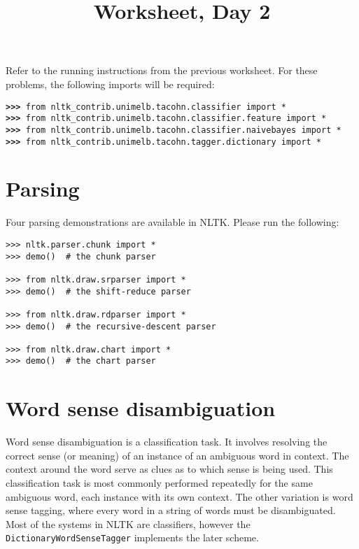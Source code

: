 \documentclass{worksheet}
\title{Worksheet, Day 2}
\begin{document}
\maketitle

Refer to the running instructions from the previous worksheet. For these
problems, the following imports will be required:

\noindent\begin{tabbing}
\tt\textbf{>>>} from nltk\_contrib.unimelb.tacohn.classifier import * \\
\tt\textbf{>>>} from nltk\_contrib.unimelb.tacohn.classifier.feature import * \\
\tt\textbf{>>>} from nltk\_contrib.unimelb.tacohn.classifier.naivebayes import * \\
\tt\textbf{>>>} from nltk\_contrib.unimelb.tacohn.tagger.dictionary import * \\
\end{tabbing}

\section*{Parsing}

Four parsing demonstrations are available in NLTK.  Please run the following:
\begin{verbatim}
>>> nltk.parser.chunk import *
>>> demo()  # the chunk parser 

>>> from nltk.draw.srparser import *
>>> demo()  # the shift-reduce parser 

>>> from nltk.draw.rdparser import *
>>> demo()  # the recursive-descent parser

>>> from nltk.draw.chart import *
>>> demo()  # the chart parser
\end{verbatim}

\section*{Word sense disambiguation}

Word sense disambiguation is a classification task. It involves resolving the
correct sense (or meaning) of an instance of an ambiguous word in context. The
context around the word serve as clues as to which sense is being used. This
classification task is most commonly performed repeatedly for the same
ambiguous word, each instance with its own context. The other variation is
word sense tagging, where every word in a string of words must be
disambiguated. Most of the systems in NLTK are classifiers, however the
\texttt{DictionaryWordSenseTagger} implements the later scheme.
\end{document}
